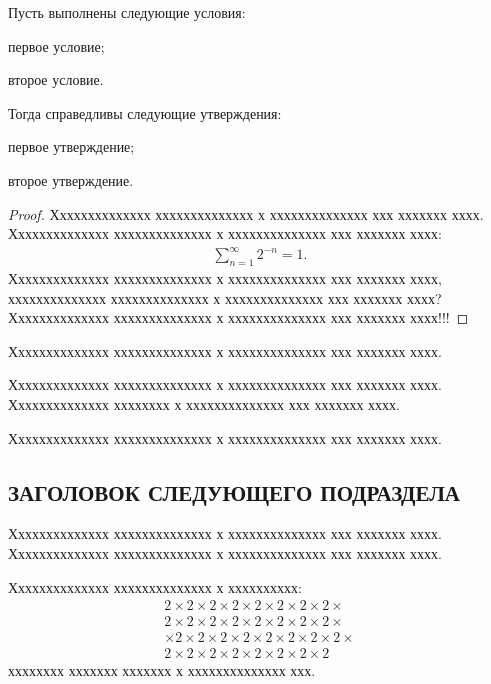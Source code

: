 \documentclass[11pt]{ubs}
\begin{document}
\begin{theorem} %
Пусть выполнены следующие условия:

\begin{ruslist}
\item
первое условие;

\item
второе условие.
\end{ruslist}
Тогда справедливы следующие утверждения:

\begin{enumlist}
\item
первое утверждение;

\item
второе утверждение.
\end{enumlist}
\end{theorem}

\begin{proof}
Хххххххххххххх хххххххххххххх х хххххххххххххх ххх ххххххх хххх.
Хххххххххххххх хххххххххххххх х хххххххххххххх ххх ххххххх хххх:
\begin{gather}
    \sum_{n=1}^{\infty} 2^{-n} = 1.
\end{gather}
Хххххххххххххх хххххххххххххх х хххххххххххххх ххх ххххххх хххх,
хххххххххххххх хххххххххххххх х хххххххххххххх ххх ххххххх хххх?
Хххххххххххххх хххххххххххххх х хххххххххххххх ххх ххххххх хххх!!!
\end{proof}
Хххххххххххххх хххххххххххххх х хххххххххххххх ххх ххххххх хххх.

\begin{corollary}
Хххххххххххххх хххххххххххххх х хххххххххххххх ххх ххххххх хххх.
Хххххххххххххх хххххххх х хххххххххххххх ххх ххххххх хххх.
\end{corollary}

Хххххххххххххх хххххххххххххх х хххххххххххххх ххх ххххххх хххх.


\subsection{\MakeUppercase{Заголовок следующего подраздела}}

Хххххххххххххх хххххххххххххх х хххххххххххххх ххх ххххххх хххх.
Хххххххххххххх хххххххххххххх х хххххххххххххх ххх ххххххх хххх.

\begin{lemma} \label{lm:1}
Хххххххххххххх хххххххххххххх х хххххххххх:
\begin{multline}
    2\times 2\times 2\times 2\times 2\times 2\times 2\times 2\times
\\
    2\times 2\times 2\times 2\times 2\times 2\times 2\times 2\times
\\
    \times 2\times 2\times 2\times 2\times 2\times 2\times 2\times 2\times
\\
    2\times 2\times 2\times 2\times 2\times 2\times 2\times 2
\end{multline}
хххххххх ххххххх ххххххх х хххххххххххххх ххх.
\end{lemma}
\end{document}

